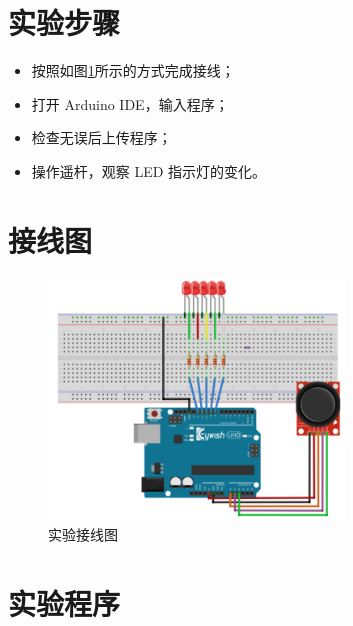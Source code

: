 \documentclass[UTF8, oneside]{ctexbook}
\begin{document}
\section{实验步骤}
\begin{itemize}
    \item[(1)] 按照如图\ref{s4_line}所示的方式完成接线；
    \item[(2)] 打开 Arduino IDE，输入程序；
    \item[(3)] 检查无误后上传程序；
    \item[(4)] 操作遥杆，观察 LED 指示灯的变化。
\end{itemize}

\section{接线图}
\begin{figure}[h]
    \centering
    \includegraphics[width=0.7\textwidth]{./result/sensor/4/lines.png}
    \caption{实验接线图}
    \label{s4_line}
\end{figure}

\section{实验程序}

\end{document}
